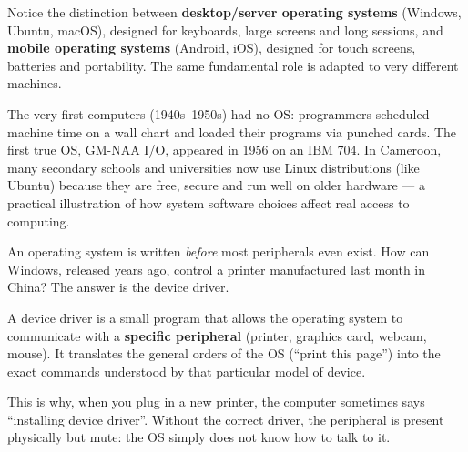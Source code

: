 \documentclass[11pt]{article}
\newcommand{\cle}[1]{{\popxbold\color{popdark}#1}}
\newcounter{popsec}
\newcounter{popsub}
\newcommand{\courssub}[1]{%
  \stepcounter{popsub}%
  \par\vspace{9pt}\noindent{\popxbold\fontsize{11.5}{13}\selectfont\color{popink}{\color{poporange}\thepopsec.\thepopsub}\hspace{6pt}#1}\par\nopagebreak\vspace{4pt}
}
\begin{document}
Notice the distinction between \textbf{desktop/server operating systems} (Windows, Ubuntu, macOS), designed for keyboards, large screens and long sessions, and \textbf{mobile operating systems} (Android, iOS), designed for touch screens, batteries and portability. The same fundamental role is adapted to very different machines.

\begin{savaistu}
The very first computers (1940s–1950s) had no OS: programmers scheduled machine time on a wall chart and loaded their programs via punched cards. The first true OS, GM-NAA I/O, appeared in 1956 on an IBM 704. In Cameroon, many secondary schools and universities now use Linux distributions (like Ubuntu) because they are free, secure and run well on older hardware — a practical illustration of how system software choices affect real access to computing.
\end{savaistu}

\courssub{Device drivers}

An operating system is written \emph{before} most peripherals even exist. How can Windows, released years ago, control a printer manufactured last month in China? The answer is the device driver.

\begin{definition}
A \cle{device driver} is a small program that allows the operating system to communicate with a \textbf{specific peripheral} (printer, graphics card, webcam, mouse). It translates the general orders of the OS (``print this page'') into the exact commands understood by that particular model of device.
\end{definition}

This is why, when you plug in a new printer, the computer sometimes says ``installing device driver''. Without the correct driver, the peripheral is present physically but mute: the OS simply does not know how to talk to it.
\end{document}
